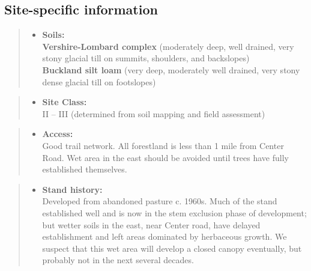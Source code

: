 \documentclass[]{tufte-handout}
\providecommand{\tightlist}{%
  \setlength{\itemsep}{0pt}\setlength{\parskip}{0pt}}
\begin{document}
\subsection{Site-specific
information}\label{site-specific-information-1}

\begin{quote}
\begin{itemize}
\tightlist
\item
  \textbf{Soils:}\\
  \indent\indent  \textbf{Vershire-Lombard complex} (moderately deep,
  well drained, very stony glacial till on summits, shoulders, and
  backslopes)\\
  \textbf{Buckland silt loam} (very deep, moderately well drained, very
  stony dense glacial till on footslopes)
\end{itemize}
\end{quote}

\begin{quote}
\begin{itemize}
\tightlist
\item
  \textbf{Site Class:}\\
  \vspace{2pt} II -- III (determined from soil mapping and field
  assessment)
\end{itemize}
\end{quote}

\begin{quote}
\begin{itemize}
\tightlist
\item
  \textbf{Access:}\\
  \vspace{2pt} Good trail network. All forestland is less than 1 mile
  from Center Road. Wet area in the east should be avoided until trees
  have fully established themselves.
\end{itemize}
\end{quote}

\begin{quote}
\begin{itemize}
\tightlist
\item
  \textbf{Stand history:}\\
  \vspace{2pt} Developed from abandoned pasture c. 1960s. Much of the
  stand established well and is now in the stem exclusion phase of
  development; but wetter soils in the east, near Center road, have
  delayed establishment and left areas dominated by herbaceous growth.
  We suspect that this wet area will develop a closed canopy eventually,
  but probably not in the next several decades.
\end{itemize}
\end{quote}
\end{document}
